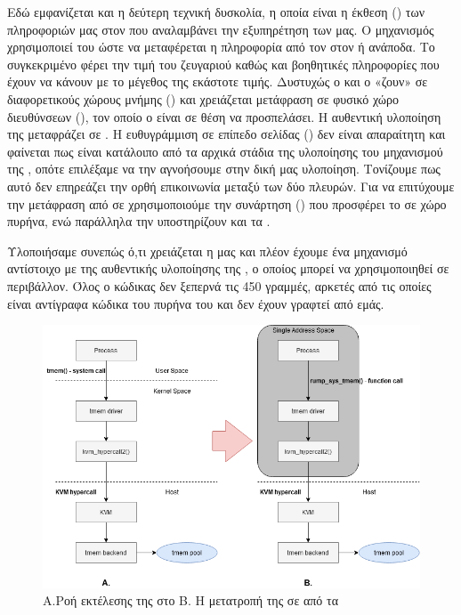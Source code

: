 Εδώ εμφανίζεται και η δεύτερη τεχνική δυσκολία, η οποία
είναι η έκθεση () των πληροφοριών μας στον  που
αναλαμβάνει την εξυπηρέτηση των  μας. O μηχανισμός
 χρησιμοποιεί  του  ώστε να
μεταφέρεται η πληροφορία από τον  στον  ή ανάποδα.
Το συγκεκριμένο  φέρει την τιμή του ζευγαριού 
καθώς και βοηθητικές πληροφορίες που έχουν να κάνουν με το μέγεθος
της εκάστοτε τιμής. Δυστυχώς ο  και ο  «ζουν» σε
διαφορετικούς χώρους μνήμης () και χρειάζεται μετάφραση
σε φυσικό χώρο διευθύνσεων (), τον οποίο
ο  είναι σε θέση να προσπελάσει. Η αυθεντική υλοποίηση της 
μεταφράζει  σε . Η
ευθυγράμμιση σε επίπεδο σελίδας () δεν είναι
απαραίτητη και φαίνεται πως είναι κατάλοιπο από τα αρχικά στάδια
της υλοποίησης του μηχανισμού της , οπότε επιλέξαμε να την
αγνοήσουμε στην δική μας υλοποίηση. Τονίζουμε πως αυτό δεν επηρεάζει την ορθή
επικοινωνία μεταξύ των δύο πλευρών. Για να επιτύχουμε την μετάφραση από
 σε  χρησιμοποιούμε την
συνάρτηση () που προσφέρει το  σε χώρο πυρήνα,
ενώ παράλληλα την υποστηρίζουν και τα .
\newline

Υλοποιήσαμε συνεπώς ό,τι χρειάζεται η  μας και
πλέον έχουμε ένα μηχανισμό αντίστοιχο με της αυθεντικής υλοποίησης
της , ο οποίος μπορεί να χρησιμοποιηθεί σε 
περιβάλλον. Όλος ο κώδικας δεν ξεπερνά τις 450 γραμμές,
αρκετές από τις οποίες είναι αντίγραφα κώδικα του πυρήνα
του  και δεν έχουν γραφτεί από εμάς.

\begin{figure}[h]
  \includegraphics[width=\textwidth]{pictures/syscallFlow.png}
  \caption{Α.Ροή εκτέλεσης της  στο 
   Β. H μετατροπή της σε  από τα }
  \label{fig:syscallFlow}
\end{figure}




